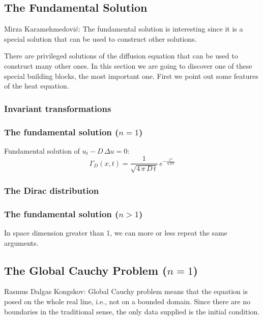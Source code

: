\documentclass[../main.tex]{subfiles}
\begin{document}
\subsection{The Fundamental Solution}

\begin{quotebar}
    Mirza Karamehmedović: The fundamental solution is interesting since it is a special solution that can be used to construct other solutions.
\end{quotebar}

There are privileged solutions of the diffusion equation that can be used to construct many other ones. In this section we are going to discover one of these special building blocks, the most important one. First we point out some features of the heat equation.

\subsubsection{Invariant transformations}

\subsubsection{The fundamental solution ($n = 1$)}

Fundamental solution of $u_t - D \, \Delta u = 0$:
\begin{equation}
    \Gamma_D(x,t) = \frac{1}{\sqrt{4 \, \pi \, D \, t}} \, e^{- \frac{x^2}{4 \, D \, t}}
\end{equation}

\subsubsection{The Dirac distribution}

\subsubsection{The fundamental solution ($n > 1$)}

In space dimension greater than 1, we can more or less repeat the same arguments.

\subsection{The Global Cauchy Problem ($n = 1$)} \label{sec:2.8}

\begin{quotebar}
    Rasmus Dalgas Kongskov: Global Cauchy problem means that the equation is posed on the whole real line, i.e., not on a bounded domain. Since there are no boundaries in the traditional sense, the only data supplied is the initial condition.
\end{quotebar}
\end{document}
